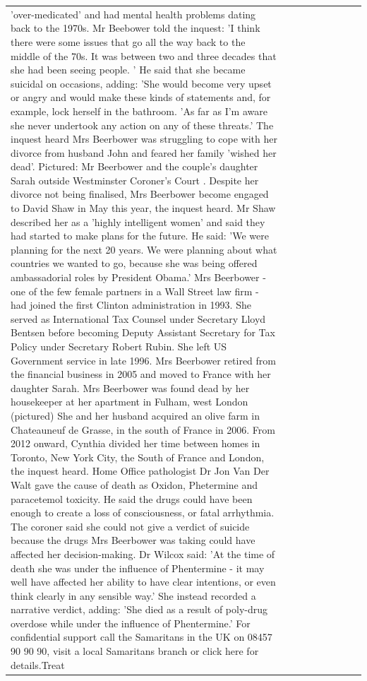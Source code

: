 \begin{table}[H]
\begin{tabular}{lllrlllll}
'over-medicated' and had mental health problems dating back to the 1970s. Mr Beebower told the inquest: 'I think there were some issues that go all the way back to the middle of the 70s. It was between two and three decades that she had been seeing people. ' He said that she became suicidal on occasions, adding: 'She would become very upset or angry and would make these kinds of statements and, for example, lock herself in the bathroom. 'As far as I'm aware she never undertook any action on any of these threats.' The inquest heard Mrs Beerbower was struggling to cope with her divorce from husband John and feared her family 'wished her dead'. Pictured: Mr Beerbower and the couple's daughter Sarah outside Westminster Coroner's Court . Despite her divorce not being finalised, Mrs Beerbower become engaged to David Shaw in May this year, the inquest heard. Mr Shaw described her as a 'highly intelligent women' and said they had started to make plans for the future. He said: 'We were planning for the next 20 years. We were planning about what countries we wanted to go, because she was being offered ambassadorial roles by President Obama.' Mrs Beerbower - one of the few female partners in a Wall Street law firm - had joined the first Clinton administration in 1993. She served as International Tax Counsel under Secretary Lloyd Bentsen before becoming Deputy Assistant Secretary for Tax Policy under Secretary Robert Rubin. She left US Government service in late 1996. Mrs Beerbower retired from the financial business in 2005 and moved to France with her daughter Sarah. Mrs Beerbower was found dead by her housekeeper at her apartment in Fulham, west London (pictured) She and her husband acquired an olive farm in Chateauneuf de Grasse, in the south of France in 2006. From 2012 onward, Cynthia divided her time between homes in Toronto, New York City, the South of France and London, the inquest heard. Home Office pathologist Dr Jon Van Der Walt gave the cause of death as Oxidon, Phetermine and paracetemol toxicity. He said the drugs could have been enough to create a loss of consciousness, or fatal arrhythmia. The coroner said she could not give a verdict of suicide because the drugs Mrs Beerbower was taking could have affected her decision-making. Dr Wilcox said: 'At the time of death she was under the influence of Phentermine - it may well have affected her ability to have clear intentions, or even think clearly in any sensible way.' She instead recorded a narrative verdict, adding: 'She died as a result of poly-drug overdose while under the influence of Phentermine.' For confidential support call the Samaritans in the UK on 08457 90 90 90, visit a local Samaritans branch or click here for details.Treat \\

\end{tabular}
\end{table}
